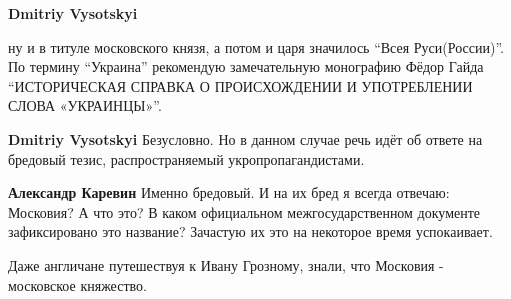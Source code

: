 \begin{itemize}
\begin{itemize}
 
\textbf{Dmitriy Vysotskyi} 

ну и в титуле московского князя, а потом и царя значилось \enquote{Всея Руси(России)}. По
термину \enquote{Украина} рекомендую замечательную монографию Фёдор Гайда \enquote{ИСТОРИЧЕСКАЯ
СПРАВКА О ПРОИСХОЖДЕНИИ И УПОТРЕБЛЕНИИ СЛОВА «УКРАИНЦЫ»}.


 
\textbf{Dmitriy Vysotskyi} Безусловно. Но в данном случае речь идёт об ответе на бредовый тезис, распространяемый укропропагандистами.

 
\textbf{Александр Каревин} Именно бредовый. И на их бред я всегда отвечаю: Московия? А что это? В каком официальном межгосударственном документе зафиксировано это название? Зачастую их это на некоторое время успокаивает.
\end{itemize}

 
Даже англичане путешествуя к Ивану Грозному, знали, что Московия - московское княжество.


\end{itemize}
